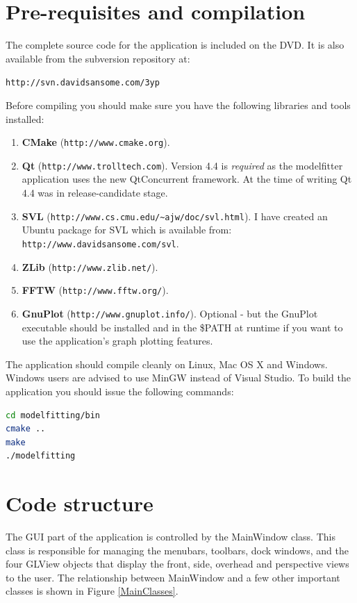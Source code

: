 \section{Pre-requisites and compilation}

The complete source code for the application is included on the DVD.
It is also available from the subversion repository at:

\texttt{http://svn.davidsansome.com/3yp}

\bigskip
\noindent Before compiling you should make sure you have the following libraries and tools installed:

\begin{enumerate}
	\item \textbf{CMake} (\texttt{http://www.cmake.org}).
	\item \textbf{Qt} (\texttt{http://www.trolltech.com}).
		Version 4.4 is \emph{required} as the modelfitter application uses the new QtConcurrent framework.
		At the time of writing Qt 4.4 was in release-candidate stage.
	\item \textbf{SVL} (\verb+http://www.cs.cmu.edu/~ajw/doc/svl.html+).
		I have created an Ubuntu package for SVL which is available from: \\
		\texttt{http://www.davidsansome.com/svl}.
	\item \textbf{ZLib} (\texttt{http://www.zlib.net/}).
	\item \textbf{FFTW} (\texttt{http://www.fftw.org/}).
	\item \textbf{GnuPlot} (\texttt{http://www.gnuplot.info/}).
		Optional - but the GnuPlot executable should be installed and in the \$PATH at runtime if you want to use the application's graph plotting features.
\end{enumerate}

The application should compile cleanly on Linux, Mac OS X and Windows.
Windows users are advised to use MinGW instead of Visual Studio.
To build the application you should issue the following commands:

\begin{lstlisting}[firstnumber=1,language=sh,frame=single,morekeywords={cmake,make}]
cd modelfitting/bin
cmake ..
make
./modelfitting
\end{lstlisting}

\section{Code structure}

The GUI part of the application is controlled by the MainWindow class.
This class is responsible for managing the menubars, toolbars, dock windows, and the four GLView objects that display the front, side, overhead and perspective views to the user.
The relationship between MainWindow and a few other important classes is shown in Figure \ref{MainClasses}.

